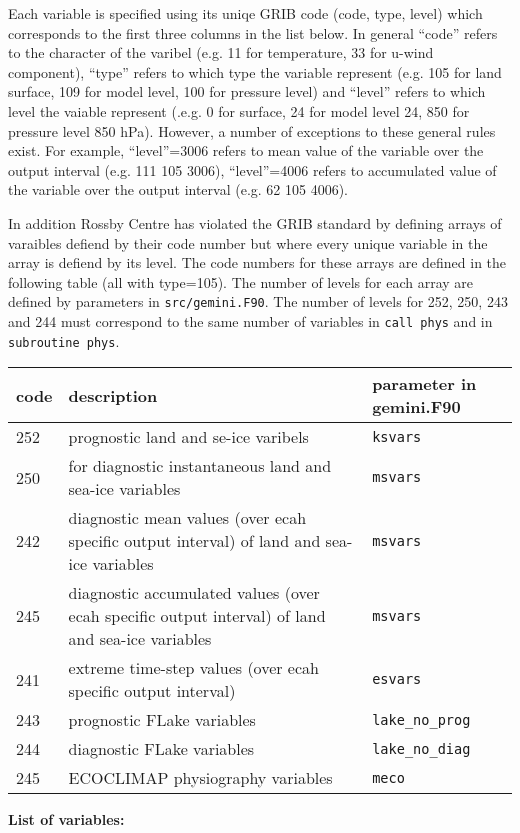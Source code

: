 \documentclass{article}
\begin{document}
Each variable is specified using its uniqe GRIB code (code, type, level) which 
corresponds to the first three columns in the list below. In general
``code'' refers to the character of the varibel (e.g. 11 for temperature, 33 for u-wind component), 
``type'' refers to which type the variable represent (e.g. 105 for land surface, 109 for model level,
100 for pressure level) and 
``level'' refers to which level the vaiable represent (.e.g. 0 for surface, 24 for model level 24,
850 for pressure level 850 hPa).
However, a number of exceptions to these general rules exist. For example,
``level''=3006 refers to mean value of the variable over the output interval (e.g. 111 105 3006),
``level''=4006 refers to accumulated value of the variable over the output interval (e.g. 62 105 4006).

In addition Rossby Centre has violated the GRIB standard by defining arrays of varaibles defiend by their code
number but where every unique variable in the array is defiend by its level. The code numbers for these arrays
are defined in the following table (all with type=105). The number of levels for each array are defined
by parameters in \verb+src/gemini.F90+. The number of levels for 252, 250, 243 and 244 must correspond to
the same number of variables
in \verb+call phys+ and in \verb+subroutine phys+.

\begin{tabular}{l p{7cm} l}
{\bf code}	& {\bf description}							& {\bf parameter in gemini.F90}\\
\hline
252		& prognostic land and se-ice varibels					& \verb+ksvars+ \\
250		& for diagnostic instantaneous land and sea-ice variables		& \verb+msvars+ \\
242		& diagnostic mean values (over ecah specific output interval) of land and sea-ice variables & \verb+msvars+	\\
245		& diagnostic accumulated values (over ecah specific output interval) of land and sea-ice variables & \verb+msvars+ \\
241		& extreme time-step values (over ecah specific output interval) & \verb+esvars+ \\
243		& prognostic FLake variables 						& \verb+lake_no_prog+ \\
244		& diagnostic FLake variables 						& \verb+lake_no_diag+ \\
245		& ECOCLIMAP physiography variables					& \verb+meco+ \\
\hline
\end{tabular}


{\bf List of variables:}


\end{document}
